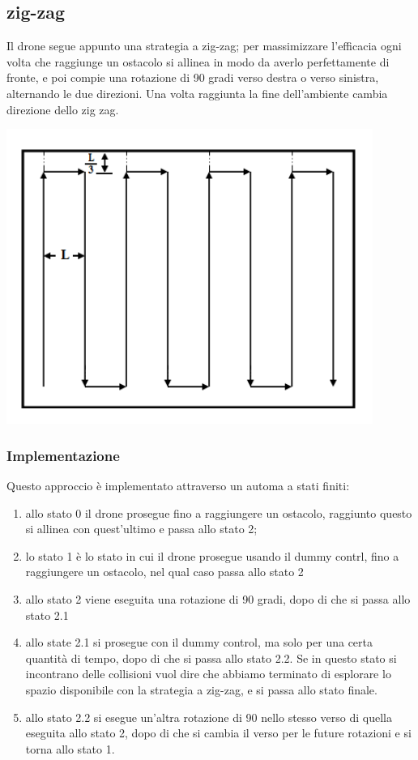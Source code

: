 \documentclass{article}
\begin{document}
\subsection{zig-zag}
Il drone segue appunto una strategia a zig-zag; per massimizzare l'efficacia ogni volta che raggiunge un ostacolo si allinea in modo da averlo perfettamente di fronte, e poi compie una rotazione di 90 gradi verso destra o verso sinistra, alternando le due direzioni.
Una volta raggiunta la fine dell'ambiente cambia direzione dello zig zag.
\begin{center}
    \includegraphics[scale=0.5]{media/zig-zag.png}
\end{center}
\subsubsection{Implementazione}
Questo approccio è implementato attraverso un automa a stati finiti:
\begin{enumerate}
    \item allo stato 0 il drone prosegue fino a raggiungere un ostacolo, raggiunto questo si allinea con quest'ultimo e passa allo stato 2;
    \item lo stato 1 è lo stato in cui il drone prosegue usando il dummy contrl, fino a raggiungere un ostacolo, nel qual caso passa allo stato 2
    \item allo stato 2 viene eseguita una rotazione di 90 gradi, dopo di che si passa allo stato 2.1
    \item allo state 2.1 si prosegue con il dummy control, ma solo per una certa quantità di tempo, dopo di che si passa allo stato 2.2. Se in questo stato si incontrano delle collisioni vuol dire che abbiamo terminato di esplorare lo spazio disponibile con la strategia a zig-zag, e si passa allo stato finale.
    \item allo stato 2.2 si esegue un'altra rotazione di 90 nello stesso verso di quella eseguita allo stato 2, dopo di che si cambia il verso per le future rotazioni e si torna allo stato 1.
\end{enumerate}
\end{document}
